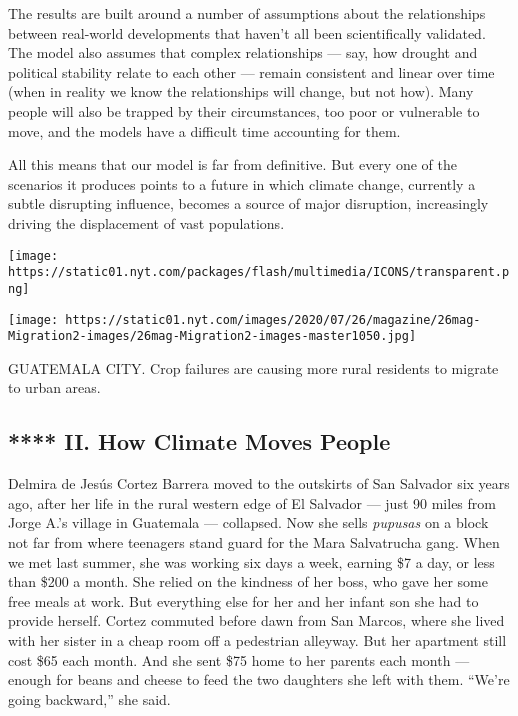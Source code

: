 The results are built around a number of assumptions about the
relationships between real-world developments that haven't all been
scientifically validated. The model also assumes that complex
relationships --- say, how drought and political stability relate to
each other --- remain consistent and linear over time (when in reality
we know the relationships will change, but not how). Many people will
also be trapped by their circumstances, too poor or vulnerable to move,
and the models have a difficult time accounting for them.

All this means that our model is far from definitive. But every one of
the scenarios it produces points to a future in which climate change,
currently a subtle disrupting influence, becomes a source of major
disruption, increasingly driving the displacement of vast populations.

\texttt{[image: https://static01.nyt.com/packages/flash/multimedia/ICONS/transparent.png]}

\texttt{[image: https://static01.nyt.com/images/2020/07/26/magazine/26mag-Migration2-images/26mag-Migration2-images-master1050.jpg]}

GUATEMALA CITY. Crop failures are causing more rural residents to
migrate to urban areas.

\hypertarget{--ii-how-climate-moves-people}{%
\subsection{ **** II. How Climate Moves
People}\label{--ii-how-climate-moves-people}}

Delmira de Jesús Cortez Barrera moved to the outskirts of San Salvador
six years ago, after her life in the rural western edge of El Salvador
--- just 90 miles from Jorge A.'s village in Guatemala --- collapsed.
Now she sells \emph{pupusas} on a block not far from where teenagers
stand guard for the Mara Salvatrucha gang. When we met last summer, she
was working six days a week, earning \$7 a day, or less than \$200 a
month. She relied on the kindness of her boss, who gave her some free
meals at work. But everything else for her and her infant son she had to
provide herself. Cortez commuted before dawn from San Marcos, where she
lived with her sister in a cheap room off a pedestrian alleyway. But her
apartment still cost \$65 each month. And she sent \$75 home to her
parents each month --- enough for beans and cheese to feed the two
daughters she left with them. ``We're going backward,'' she said.


